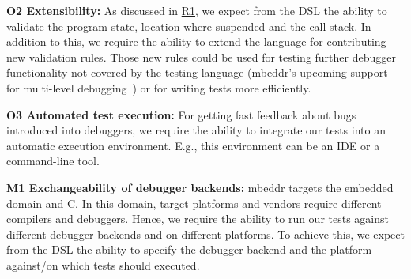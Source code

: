 \textbf{\label{O2}O2 Extensibility:} As discussed in
\hyperref[R1]{R1}, 
we expect from the \ac{DSL} the ability to validate the program state, location
where suspended and the call stack. In addition to this, we
require the ability to extend the language for contributing new
validation rules. Those new rules could be used for testing further debugger
functionality not covered by the testing language (\eg mbeddr's upcoming support
for multi-level
debugging~\cite{MultiLevelDebugging:WSRE:breakedForInlining}) 
or for writing tests more efficiently.


\textbf{\label{O3}O3 Automated test execution:} For getting fast
feedback about bugs introduced into debuggers, 
we require the ability to integrate our 
tests into an automatic execution environment. E.g., this environment can be
an \ac{IDE} or a command-line tool. 

\textbf{\label{M1}M1 Exchangeability of debugger backends:}
mbeddr targets the embedded domain and C. In this domain, target platforms and
vendors require different compilers and debuggers. 
Hence, we require the ability to run our tests against
different debugger backends and on different platforms. To achieve this,
we expect from the \ac{DSL} the ability to specify the debugger backend
and the platform against/on which tests should executed.

